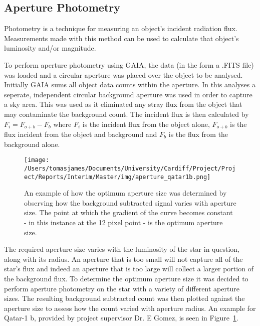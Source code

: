\documentclass[twoside,4pt]{article}
\begin{document}
\begin{multicols}{2}
\subsection{Aperture Photometry}
Photometry is a technique for measuring an object's incident radiation flux. Measurements made with this method can be used to calculate that object's luminosity and/or magnitude.

To perform aperture photometry using GAIA, the data (in the form a .FITS file) was loaded and a circular aperture was placed over the object to be analysed. Initially GAIA sums all object data counts within the aperture. In this analyses a seperate, independent circular background aperture was used in order to capture a sky area. This was used as it eliminated any stray flux from the object that may contaminate the background count. The incident flux is then calculated by $F_{i} = F_{o+b} - F_{b}$ where $F_{i}$ is the incident flux from the object alone, $F_{o+b}$ is the flux incident from the object and background and $F_{b}$ is the flux from the background alone.

\begin{figure}[H]
\centering
    \texttt{[image: /Users/tomasjames/Documents/University/Cardiff/Project/Project/Reports/Interim/Master/img/aperture\_qatar1b.png]}
\caption[An example of how the optimum aperture size was determined by observing how the background subtracted signal varies with aperture size. The point at which the gradient of the curve becomes constant - in this instance at the 12 pixel point - is the optimum aperture size.]{An example of how the optimum aperture size was determined by observing how the background subtracted signal varies with aperture size. The point at which the gradient of the curve becomes constant - in this instance at the 12 pixel point - is the optimum aperture size.} \label{qatar1b}
\end{figure}

The required aperture size varies with the luminosity of the star in question, along with its radius. An aperture that is too small will not capture all of the star's flux and indeed an aperture that is too large will collect a larger portion of the background flux. To determine the optimum aperture size it was decided to perform aperture photometry on the star with a variety of different aperture sizes.  The resulting background subtracted count was then plotted against the aperture size to assess how the count varied with aperture radius. An example for Qatar-1 b, provided by project supervisor Dr. E Gomez, is seen in Figure~\ref{qatar1b}.


\end{multicols}
\end{document}
